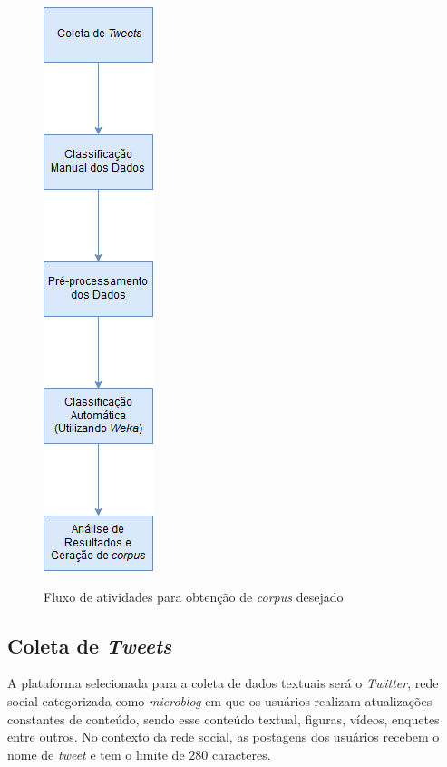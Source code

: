 \begin{figure}[!h]
\centering 
\caption{Fluxo de atividades para obtenção de \textit{corpus} desejado}
\includegraphics[scale=0.45]{imagens/fluxodesenvolvimento.png}
\label{fig:fluxodesenvolvimento}
\end{figure}

\subsection{Coleta de \textit{Tweets}}
\label{subsec:coletatweets}
A plataforma selecionada para a coleta de dados textuais será o \textit{Twitter}, rede social categorizada como \textit{microblog} em que os usuários realizam atualizações constantes de conteúdo, sendo esse conteúdo textual, figuras, vídeos, enquetes entre outros. No contexto da rede social, as postagens dos usuários recebem o nome de \textit{tweet} e tem o limite de $280$ caracteres.


